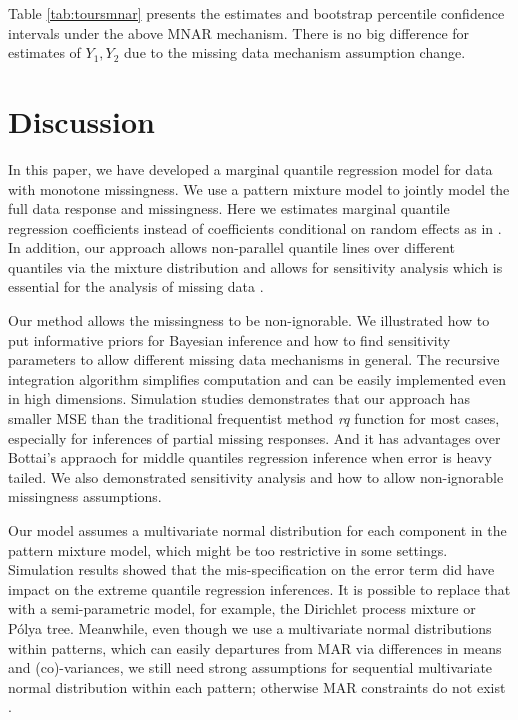 \documentclass[12pt]{article}
\newcommand{\polya}{P\'{o}lya}
\begin{document}
Table \ref{tab:toursmnar} presents the estimates and bootstrap
percentile confidence intervals under the above MNAR mechanism. There
is no big difference for estimates of $Y_1, Y_2$ due to the missing
data mechanism assumption change.

\section{Discussion}
\label{sec:discussion}

In this paper, we have developed a marginal quantile regression model
for data with monotone missingness. We use a pattern mixture model to
jointly model the full data response and missingness. Here we
estimates marginal quantile regression coefficients instead of
coefficients conditional on random effects as in \citet{yuan2010}. In
addition, our approach allows non-parallel quantile lines over
different quantiles via the mixture distribution and allows for
sensitivity analysis which is essential for the analysis of missing
data \citep{nas2010}.

Our method allows the missingness to be non-ignorable.  We illustrated
how to put informative priors for Bayesian inference and how to find
sensitivity parameters to allow different missing data mechanisms in
general. The recursive integration algorithm simplifies computation
and can be easily implemented even in high dimensions.  Simulation
studies demonstrates that our approach has smaller MSE than the
traditional frequentist method \textit{rq} function for most cases,
especially for inferences of partial missing responses. And it has
advantages over Bottai's appraoch for middle quantiles regression
inference when error is heavy tailed. We also demonstrated sensitivity
analysis and how to allow non-ignorable missingness assumptions.

Our model assumes a multivariate normal distribution for each
component in the pattern mixture model, which might be too restrictive
in some settings. Simulation results showed that the mis-specification
on the error term did have impact on the extreme quantile regression
inferences.  It is possible to replace that with a semi-parametric
model, for example, the Dirichlet process mixture or \polya{} tree.
Meanwhile, even though we use a multivariate normal distributions
within patterns, which can easily departures from MAR via differences
in means and (co)-variances, we still need strong assumptions for
sequential multivariate normal distribution within each pattern;
otherwise MAR constraints do not exist \citep{wang2011}.
\end{document}
